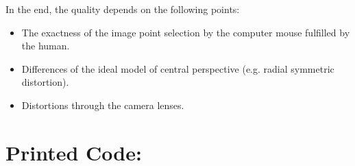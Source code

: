 \documentclass[a4paper,headings=small]{scrartcl}
\numberwithin{equation}{section} %
\numberwithin{figure}{section}   %
\begin{document}
In the end, the quality depends on the following points:
\begin{itemize} 
\item The exactness of the image point selection by the computer mouse fulfilled by the human. 
\item Differences of the ideal model of central perspective (e.g. radial symmetric distortion).
\item Distortions through the camera lenses.
\end{itemize}

\section{Printed Code:}


\end{document}
